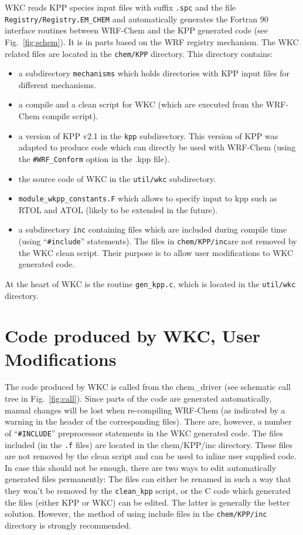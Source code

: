 \documentclass[twoside, 12pt, letterpaper]{article}
\begin{document}
 WKC reads KPP species input files with suffix {\tt .spc} and the file {\tt Registry/Registry.EM\_CHEM} and automatically generates the Fortran 90 interface routines between WRF-Chem and the KPP generated code (see  Fig.~\ref{fig:schem}). It is in parts based on the WRF registry mechanism. The WKC related files are located in the {\tt chem/KPP} directory. This directory contains: 
\begin{itemize}
\item a subdirectory {\tt mechanisms} which holds directories with KPP input files for different mechanisms. 
\item a compile and a clean script for WKC (which are executed from the WRF-Chem compile script).
\item a version of KPP v2.1  in the {\tt kpp} subdirectory. This version of KPP was adapted to produce code which can directly be used with WRF-Chem  (using the {\tt \#WRF\_Conform} option in the .kpp file).
\item the source code of WKC in the {\tt util/wkc} subdirectory.
\item {\tt module\_wkpp\_constants.F} which allows to specify input to kpp such as RTOL and ATOL (likely to be extended in the future). 
\item a subdirectory {\tt inc} containing files which are included during compile time  (using  ``{\tt \#include}'' statements). The files in {\tt chem/KPP/inc}are not removed by the WKC clean script. Their purpose is to allow user modifications to WKC generated code. 
 \end{itemize} 
 
At the heart of WKC is the routine {\tt gen\_kpp.c}, which is located in the {\tt util/wkc} directory.




\section{Code produced by WKC, User Modifications}
The code produced by WKC is called from the chem\_driver (see schematic call tree in Fig.~\ref{fig:call}). Since parts of the code are generated automatically, manual changes will be lost when re-compiling WRF-Chem (as indicated by a warning in the header of the corresponding files). There are, however, a number of ``{\tt \#INCLUDE}'' preprocessor statements in the WKC generated code. The files included (in the {\tt .f} files) are located in the chem/KPP/inc directory. These files are not removed by the clean script and can be used to inline user supplied code. In case this should not be enough, there are two ways to edit automatically generated files permanently: The files can either be renamed in such a way that they won't be removed by the {\tt clean\_kpp} script, or the C code which generated the files (either KPP or WKC) can be edited. The latter is generally the better solution. However, the method of using include files in the {\tt chem/KPP/inc} directory is strongly recommended.     
  
\end{document}
